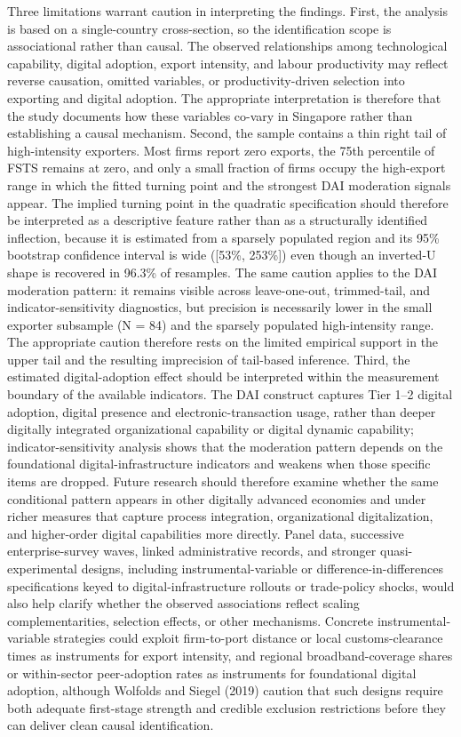 \documentclass[12pt,a4paper]{article}
\begin{document}
Three limitations warrant caution in interpreting the findings. First,
the analysis is based on a single-country cross-section, so the
identification scope is associational rather than causal. The observed
relationships among technological capability, digital adoption, export
intensity, and labour productivity may reflect reverse causation,
omitted variables, or productivity-driven selection into exporting and
digital adoption. The appropriate interpretation is therefore that the
study documents how these variables co-vary in Singapore rather than
establishing a causal mechanism. Second, the sample contains a thin
right tail of high-intensity exporters. Most firms report zero exports,
the 75th percentile of FSTS remains at zero, and only a small fraction
of firms occupy the high-export range in which the fitted turning point
and the strongest DAI moderation signals appear. The implied turning
point in the quadratic specification should therefore be interpreted as
a descriptive feature rather than as a structurally identified
inflection, because it is estimated from a sparsely populated region and
its 95\% bootstrap confidence interval is wide ({[}53\%, 253\%{]}) even
though an inverted-U shape is recovered in 96.3\% of resamples. The same
caution applies to the DAI moderation pattern: it remains visible across
leave-one-out, trimmed-tail, and indicator-sensitivity diagnostics, but
precision is necessarily lower in the small exporter subsample (N = 84)
and the sparsely populated high-intensity range. The appropriate caution
therefore rests on the limited empirical support in the upper tail and
the resulting imprecision of tail-based inference. Third, the estimated
digital-adoption effect should be interpreted within the measurement
boundary of the available indicators. The DAI construct captures Tier
1--2 digital adoption, digital presence and electronic-transaction
usage, rather than deeper digitally integrated organizational capability
or digital dynamic capability; indicator-sensitivity analysis shows that
the moderation pattern depends on the foundational
digital-infrastructure indicators and weakens when those specific items
are dropped. Future research should therefore examine whether the same
conditional pattern appears in other digitally advanced economies and
under richer measures that capture process integration, organizational
digitalization, and higher-order digital capabilities more directly.
Panel data, successive enterprise-survey waves, linked administrative
records, and stronger quasi-experimental designs, including
instrumental-variable or difference-in-differences specifications keyed
to digital-infrastructure rollouts or trade-policy shocks, would also
help clarify whether the observed associations reflect scaling
complementarities, selection effects, or other mechanisms. Concrete
instrumental-variable strategies could exploit firm-to-port distance or
local customs-clearance times as instruments for export intensity, and
regional broadband-coverage shares or within-sector peer-adoption rates
as instruments for foundational digital adoption, although Wolfolds and
Siegel (2019) caution that such designs require both adequate
first-stage strength and credible exclusion restrictions before they can
deliver clean causal identification.
\end{document}
